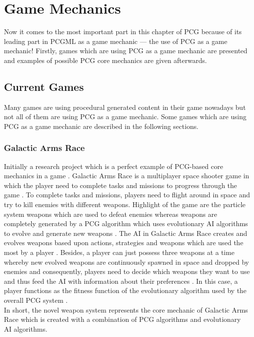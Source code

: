 \documentclass[MGS,Master,english]{twbook}%
\begin{document}
\section{Game Mechanics}
Now it comes to the most important part in this chapter of PCG because of its leading part in PCGML as a game mechanic — the use of PCG as a game mechanic! Firstly, games which are using PCG as a game mechanic are presented and examples of possible PCG core mechanics are given afterwards.

\subsection{Current Games}
Many games are using procedural generated content in their game nowadays but not all of them are using PCG as a game mechanic. Some games which are using PCG as a game mechanic are described in the following sections.
\subsubsection{Galactic Arms Race}
Initially a research project which is a perfect example of PCG-based core mechanics in a game \cite{game::galacticArmsRace}. Galactic Arms Race is a multiplayer space shooter game in which the player need to complete tasks and missions to progress through the game \cite{game::galacticArmsRace}. To complete tasks and missions, players need to flight around in space and try to kill enemies with different weapons. Highlight of the game are the particle system weapons which are used to defeat enemies whereas weapons are completely generated by a PCG algorithm which uses evolutionary AI algorithms to evolve and generate new weapons \cite{pcg::galacticArmsRace}. The AI in Galactic Arms Race creates and evolves weapons based upon actions, strategies and weapons which are used the most by a player \cite{pcg::galacticArmsRace} \cite{pcg::galacticArmsRace::evolvingContent}. Besides, a player can just possess three weapons at a time whereby new evolved weapons are continuously spawned in space and dropped by enemies and consequently, players need to decide which weapons they want to use and thus feed the AI with information about their preferences \cite{pcg::galacticArmsRace::evolvingContent}. In this case, a player functions as the fitness function of the evolutionary algorithm used by the overall PCG system \cite{pcg::galacticArmsRace::evolvingContent}.\\
In short, the novel weapon system represents the core mechanic of Galactic Arms Race which is created with a combination of PCG algorithms and evolutionary AI algorithms.
\end{document}
